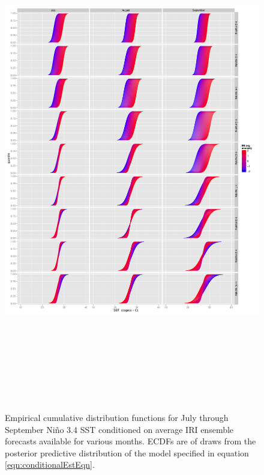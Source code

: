 \documentclass[authoryear]{article}
\begin{document}
\begin{figure}[!htbp]
\begin{center}
  \includegraphics[height=22cm, keepaspectratio]{Pricingfigs/conditionalCDFs07to09TraditionalCDFconfig}
  \caption{Empirical cumulative distribution functions for July through September Ni\~no 3.4 SST conditioned on average IRI ensemble forecasts available for various months. ECDFs are of draws from the posterior predictive distribution of the model specified in equation \ref{eqn:conditionalEstEqn}.}
   \label{fig:conditionalCDFs07to09}
   \end{center}
\end{figure}
\end{document}
